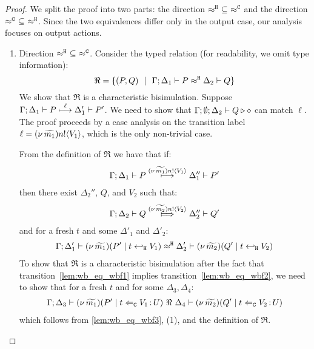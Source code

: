 \begin{proof}
	\noi
	We split the proof into two parts: the direction
	$\approx^\mathtt{H}\ \subseteq\ \approx^\mathtt{C}$ and the direction
	$\approx^\mathtt{C}\ \subseteq\ \approx^\mathtt{H}$.
 Since the two equivalences differ only in the output case, our analysis focuses on output actions.

	\begin{enumerate}[1.]
		\item	Direction $\approx^\mathtt{H}\ \subseteq\ \approx^\mathtt{C}$. Consider the typed relation (for readability, we omit type information):
				\[
					\Re = \{
								(P, Q) 
								\ \ |\ \ 
								\Gamma; \Delta_1 \vdash P \approx^\mathtt{H} \Delta_2 \vdash Q\}
				\]
				We show that $\Re$ is a characteristic bisimulation.
				Suppose
				$
						\Gamma; \Delta_1 \vdash P \stackrel{ \ell}{\longmapsto} \Delta_1' \vdash P'
				$.
				We need to show that $\Gamma; \emptyset; \Delta_2 \vdash Q \triangleright \diamond$
				can match  $\ell$.
				The proof proceeds by a case analysis on the transition label $\ell = (\nu\, \widetilde{m_1}) n ! \langle V_1 \rangle$, which is the only non-trivial case.

							\smallskip
							
							 From the definition of $\Re$ we have that if:
							\begin{eqnarray}
								\Gamma; \Delta_1 \vdash P \stackrel{(\nu\, \widetilde{m_1}) n ! \langle V_1 \rangle}{\longmapsto} \Delta_1'' \vdash P'
								\label{lem:wb_eq_wbf1}
							\end{eqnarray}
							then there exist $\Delta_2''$, $Q$, and $V_2$ such that:
							\begin{eqnarray}
								\horel{\Gamma}{\Delta_2}{Q}{\Hby{\news{\widetilde{m_2}} \bactout{n}{V_2}}}{\Delta_2''}{Q'}
								\label{lem:wb_eq_wbf2}
							\end{eqnarray}
							and for a fresh $t$ and some $\Delta'_1$ and $\Delta'_2$:
							\begin{eqnarray}
								\Gamma; \Delta_1' \vdash (\nu\, \widetilde{m_1})(P' \;|\; t \hookleftarrow_{\mathtt{H}} V_1) \approx^\mathtt{H} \Delta_2' \vdash (\nu\, \widetilde{m_2})(Q' \;|\; t \hookleftarrow_{\mathtt{H}} V_2 )
								\label{lem:wb_eq_wbf3}
							\end{eqnarray}
							\noi 
							To show that $\Re$ is a characteristic bisimulation
							after the fact that transition~\eqref{lem:wb_eq_wbf1} implies transition~\eqref{lem:wb_eq_wbf2},
							we need to show that for a fresh $t$ and for some $\Delta_3, \Delta_4$:
							\begin{eqnarray}
								\Gamma; \Delta_3 \vdash (\nu\, \widetilde{m_1})(P' \;|\; t \Leftarrow_{\mathtt{C}} V_1{\,:\,}U) \ \Re\  \Delta_4 \vdash (\nu\, \widetilde{m_2})(Q' \;|\; t \Leftarrow_{\mathtt{C}} V_2{\,:\,}U)
								\label{lem:wb_eq_wbf4}
							\end{eqnarray}
							\noi which follows from \eqref{lem:wb_eq_wbf3}, (1),
							and the definition of $\Re$.


\end{enumerate}
\end{proof}
